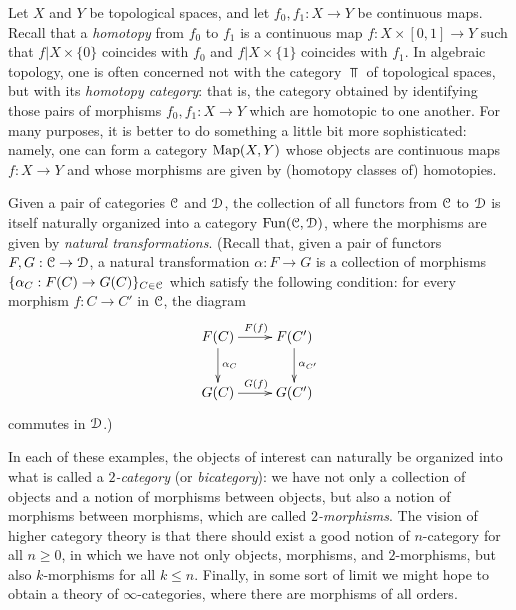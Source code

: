 \begin{example}\label{2cat2}
Let $X$ and $Y$ be topological spaces, and let $f_0, f_1: X \rightarrow Y$ be continuous maps.
Recall that a {\it homotopy} from $f_0$ to $f_1$ is a continuous map $f: X \times [0,1] \rightarrow Y$
such that $f | X \times \{0\}$ coincides with $f_0$ and $f | X \times \{1\}$ coincides with $f_1$.
In algebraic topology, one is often concerned not with the category $\Top$ of topological spaces,
but with its {\it homotopy category}: that is, the category obtained by identifying those pairs of
morphisms $f_0, f_1: X \rightarrow Y$ which are homotopic to one another. For many purposes, it is better to do something a little bit more sophisticated: namely, one can form a category
$\operatorname{{Map}}(X,Y)$ whose objects are continuous maps $f: X \rightarrow Y$ and whose morphisms
are given by (homotopy classes of) homotopies.
\end{example}

\begin{example}\label{2cat3}
Given a pair of categories $\operatorname{\mathcal{C}}$ and $\operatorname{\mathcal{D}}$, the collection of all functors from
$\operatorname{\mathcal{C}}$ to $\operatorname{\mathcal{D}}$ is itself naturally organized into a category $\operatorname{Fun}( \operatorname{\mathcal{C}}, \operatorname{\mathcal{D}})$, where
the morphisms are given by {\it natural transformations}. (Recall that, given a pair of functors
$F,G: \operatorname{\mathcal{C}} \rightarrow \operatorname{\mathcal{D}}$, a natural transformation $\alpha: F \rightarrow G$ is a collection
of morphisms $\{ \alpha_{C}: F(C) \rightarrow G(C) \}_{C \in \operatorname{\mathcal{C}}}$ which satisfy the following
condition: for every morphism $f: C \rightarrow C'$ in $\operatorname{\mathcal{C}}$, the diagram
$$ \xymatrix{ F(C) \ar[r]^{F(f)} \ar[d]^{\alpha_C} & F(C') \ar[d]^{\alpha_{C'} } \\
G(C) \ar[r]^{G(f)} & G(C') }$$
commutes in $\operatorname{\mathcal{D}}$.)
\end{example}

In each of these examples, the objects of interest can naturally be organized into what is
called a {\it $2$-category} (or {\it bicategory}): we have not only a collection of objects and a notion of morphisms between objects, but also a notion of morphisms between morphisms, which
are called {\it $2$-morphisms}. The vision of higher category theory is that there should exist a good notion of $n$-category for all $n \geq 0$, in which we have not only objects,
morphisms, and $2$-morphisms, but also $k$-morphisms for all $k
\leq n$. Finally, in some sort of limit we might hope to obtain a theory
of $\infty$-categories, where there are morphisms of all orders.

